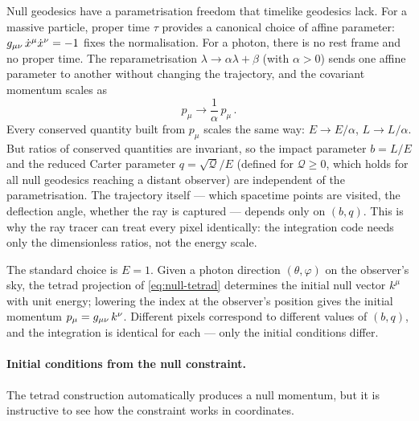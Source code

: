 Null geodesics have a parametrisation freedom that timelike geodesics lack.
For a massive particle, proper time $\tau$ provides a canonical choice of
affine parameter: $g_{\mu\nu}\,\dot{x}^\mu\dot{x}^\nu = -1$ fixes the
normalisation.  For a photon, there is no rest frame and no proper time.
The reparametrisation $\lambda \to \alpha\lambda + \beta$ (with
$\alpha > 0$) sends one affine parameter to another without changing the
trajectory, and the covariant momentum scales as
%
\begin{equation}
  p_\mu \to \frac{1}{\alpha}\,p_\mu \,.
  \label{eq:affine-rescaling}
\end{equation}
%
Every conserved quantity built from $p_\mu$ scales the same way:
$E \to E/\alpha$, $L \to L/\alpha$.  But ratios of conserved quantities
are invariant, so the impact parameter $b = L/E$ and the reduced Carter
parameter $q = \sqrt{\mathcal{Q}}/E$ (defined for $\mathcal{Q} \geq 0$,
which holds for all null geodesics reaching a distant observer) are
independent of the parametrisation.  The trajectory itself --- which
spacetime points are visited, the deflection angle, whether the ray is
captured --- depends only on $(b, q)$.  This is why the ray tracer can
treat every pixel identically: the integration code needs only the
dimensionless ratios, not the energy scale.

The standard choice is $E = 1$.  Given a photon direction
$(\theta, \varphi)$ on the observer's sky, the tetrad projection of
\cref{eq:null-tetrad} determines the initial null vector $k^\mu$ with
unit energy; lowering the index at the observer's position gives the
initial momentum $p_\mu = g_{\mu\nu}\,k^\nu$.  Different pixels correspond
to different values of $(b, q)$, and the integration is identical for
each --- only the initial conditions differ.

\paragraph{Initial conditions from the null constraint.}

The tetrad construction automatically produces a null momentum, but it
is instructive to see how the constraint works in coordinates.

